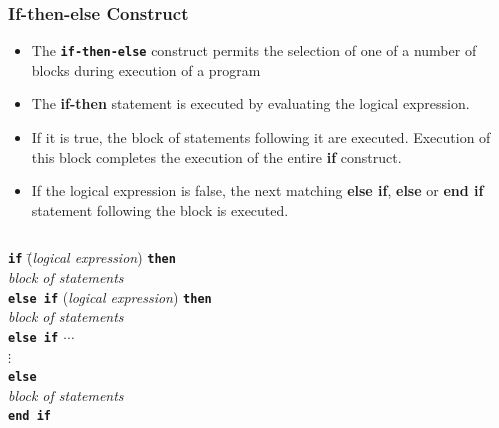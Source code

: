 \documentclass[slidestop,mathserif,compress,xcolor=svgnames]{beamer}
\begin{document}
\begin{frame}[allowframebreaks]
  \frametitle{\small If-then-else Construct}
  \begin{itemize}
    \item The \textbf{\texttt{if-then-else}} construct permits the selection of one of a number of blocks during execution of a program
    \item The \textbf{if-then} statement is executed by evaluating the logical expression.
    \item If it is true, the block of statements following it are executed. Execution of this block completes the execution of the entire \textbf{if} construct.
    \item If the logical expression is false, the next matching \textbf{else if}, \textbf{else} or \textbf{end if} statement following the block is executed.
  \end{itemize}
  
  \begin{columns}
    \column{5cm}
    \begin{block}{ }
      \begin{tabbing}
        \textbf{\texttt{if}} \=(\textit{logical expression}) \textbf{\texttt{then}} \\
        \> \textit{block of statements} \\
        \textbf{\texttt{else if}} (\textit{logical expression}) \textbf{\texttt{then}} \\
        \> \textit{block of statements} \\
        \textbf{\texttt{else if} $\cdots$} \\
        \> $\vdots$ \\
        \textbf{\texttt{else}} \\
        \> \textit{block of statements} \\
        \textbf{\texttt{end if}}
      \end{tabbing}
    \end{block}
  \end{columns}
  

\end{frame}
\end{document}
